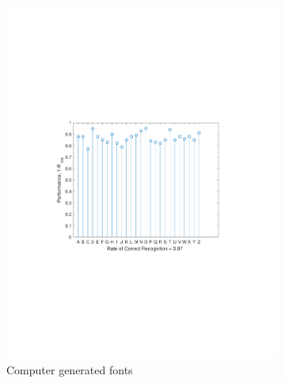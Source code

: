 \documentclass[journal,a4paper,onecolumn,11pt]{IEEEtran}
\begin{document}
\begin{figure}[!h]
\begin{subfigure}{.5\textwidth}
		\centering
		\includegraphics[clip, trim=0cm .25cm 0cm .4cm, width=\textwidth]{performance_fnt_sm.pdf}
		\caption{Computer generated fonts}
		\label{fig:performance_fnt_sm}
	\end{subfigure}
	\begin{subfigure}{.5\textwidth}
		\centering

\end{subfigure}
\end{figure}
\end{document}
